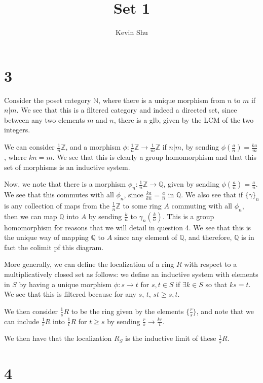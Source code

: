 \documentclass[a4paper]{article}
\author{Kevin Shu}
\title{Set 1}
\theoremstyle{named}
\let\tempa\section
\renewcommand{\section}[1]{\tempa*{#1}}
\begin{document}
\maketitle
\newpage
\section{3}
Consider the poset category $\mathbb{N}$, where there is a unique morphism from $n$ to $m$ if $n | m$. We see that this is a filtered category and indeed a directed set, since between any two elements $m$ and $n$, there is a glb, given by the LCM of the two integers.

We can consider $\frac{1}{n}\mathbb{Z}$, and a morphism $\phi :\frac{1}{n}\mathbb{Z}\rightarrow\frac{1}{m}\mathbb{Z}$ if $n | m$, by sending $\phi(\frac{a}{n}) = \frac{ka}{m}$, where $kn = m$. We see that this is clearly a group homomorphism and that this set of morphisms is an inductive system.

Now, we note that there is a morphism $\phi_n : \frac{1}{n}\mathbb{Z} \rightarrow \mathbb{Q}$, given by sending $\phi(\frac{a}{n}) = \frac{a}{n}$. We see that this commutes with all $\phi_n$, since $\frac{ka}{kn} = \frac{a}{n}$ in $\mathbb{Q}$. We also see that if $\{\gamma\}_n$ is any collection of maps from the $\frac{1}{n}\mathbb{Z}$ to some ring $A$ commuting with all $\phi_n$, then we can map $\mathbb{Q}$ into $A$ by sending $\frac{k}{n}$ to $\gamma_n(\frac{k}{n})$. This is a group homomorphism for reasons that we will detail in question 4. We see that this is the unique way of mapping $\mathbb{Q}$ to $A$ since any element of $\mathbb{Q}$, and therefore, $\mathbb{Q}$ is in fact the colimit pf this diagram.

More generally, we can define the localization of a ring $R$ with respect to a multiplicatively closed set as follows: we define an inductive system with elements in $S$ by having a unique morphism $\phi : s\rightarrow t$ for $s, t \in S$ if $\exists k \in S$ so that $ks = t$. We see that this is filtered because for any $s$, $t$, $st \ge s, t$.

We then consider $\frac{1}{s}R$ to be the ring given by the elements $\{\frac{r}{s}\}$, and note that we can include $\frac{1}{s}R$ into $\frac{1}{t}R$ for $t \ge s$ by sending $\frac{r}{s} \rightarrow \frac{kr}{t}$. 

We then have that the localization $R_S$ is the inductive limit of these $\frac{1}{s}R$. 
\section{4}
\end{document}
